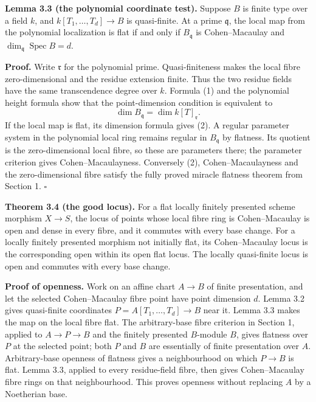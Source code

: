 \documentclass[11pt,a4paper,openany]{report}
\begin{document}
\textbf{Lemma 3.3 (the polynomial coordinate test).} Suppose \(B\) is finite type over a field \(k\), and \(k[T_1,\ldots,T_d]\to B\) is quasi-finite. At a prime \(\mathfrak q\), the local map from the polynomial localization is flat if and only if \(B_{\mathfrak q}\) is Cohen--Macaulay and \(\dim_{\mathfrak q}\operatorname{Spec}B=d\).

\textbf{Proof.} Write \(\mathfrak r\) for the polynomial prime. Quasi-finiteness makes the local fibre zero-dimensional and the residue extension finite. Thus the two residue fields have the same transcendence degree over \(k\). Formula (1) and the polynomial height formula show that the point-dimension condition is equivalent to \[
  \dim B_{\mathfrak q}=\dim k[T]_{\mathfrak r}.
  \tag{2}
  \] If the local map is flat, its dimension formula gives (2). A regular parameter system in the polynomial local ring remains regular in \(B_{\mathfrak q}\) by flatness. Its quotient is the zero-dimensional local fibre, so these are parameters there; the parameter criterion gives Cohen--Macaulayness. Conversely (2), Cohen--Macaulayness and the zero-dimensional fibre satisfy the fully proved miracle flatness theorem from Section 1. \(\square\)

\textbf{Theorem 3.4 (the good locus).} For a flat locally finitely presented scheme morphism \(X\to S\), the locus of points whose local fibre ring is Cohen--Macaulay is open and dense in every fibre, and it commutes with every base change. For a locally finitely presented morphism not initially flat, its Cohen--Macaulay locus is the corresponding open within its open flat locus. The locally quasi-finite locus is open and commutes with every base change.

\textbf{Proof of openness.} Work on an affine chart \(A\to B\) of finite presentation, and let the selected Cohen--Macaulay fibre point have point dimension \(d\). Lemma 3.2 gives quasi-finite coordinates \(P=A[T_1,\ldots,T_d]\to B\) near it. Lemma 3.3 makes the map on the local fibre flat. The arbitrary-base fibre criterion in Section 1, applied to \(A\to P\to B\) and the finitely presented \(B\)-module \(B\), gives flatness over \(P\) at the selected point; both \(P\) and \(B\) are essentially of finite presentation over \(A\). Arbitrary-base openness of flatness gives a neighbourhood on which \(P\to B\) is flat. Lemma 3.3, applied to every residue-field fibre, then gives Cohen--Macaulay fibre rings on that neighbourhood. This proves openness without replacing \(A\) by a Noetherian base.
\end{document}
